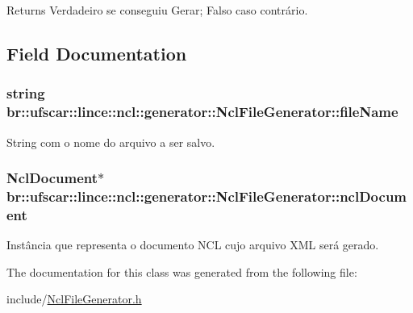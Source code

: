 \begin{DoxyReturn}{Returns}
Verdadeiro se conseguiu Gerar; Falso caso contrário. 
\end{DoxyReturn}


\subsection{Field Documentation}
\hypertarget{classbr_1_1ufscar_1_1lince_1_1ncl_1_1generator_1_1NclFileGenerator_a32edd0aef97357d73387db337d3329c5}{
\subsubsection[{fileName}]{\setlength{\rightskip}{0pt plus 5cm}string {\bf br::ufscar::lince::ncl::generator::NclFileGenerator::fileName}}}
\label{classbr_1_1ufscar_1_1lince_1_1ncl_1_1generator_1_1NclFileGenerator_a32edd0aef97357d73387db337d3329c5}


String com o nome do arquivo a ser salvo. 

\hypertarget{classbr_1_1ufscar_1_1lince_1_1ncl_1_1generator_1_1NclFileGenerator_adbc2970dc25159b55e4b18ef2cf2eb88}{
\subsubsection[{nclDocument}]{\setlength{\rightskip}{0pt plus 5cm}NclDocument$\ast$ {\bf br::ufscar::lince::ncl::generator::NclFileGenerator::nclDocument}}}
\label{classbr_1_1ufscar_1_1lince_1_1ncl_1_1generator_1_1NclFileGenerator_adbc2970dc25159b55e4b18ef2cf2eb88}


Instância que representa o documento NCL cujo arquivo XML será gerado. 



The documentation for this class was generated from the following file:\begin{DoxyCompactItemize}
\item 
include/\hyperlink{NclFileGenerator_8h}{NclFileGenerator.h}\end{DoxyCompactItemize}
